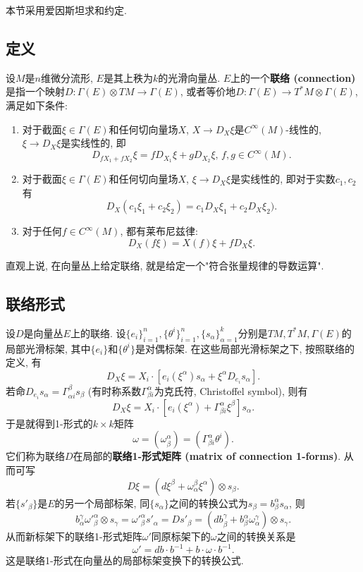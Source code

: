 
本节采用爱因斯坦求和约定.

\subsection{定义}
设$M$是$n$维微分流形, $E$是其上秩为$k$的光滑向量丛. $E$上的一个\textbf{联络 (connection) }是指一个映射$D:\Gamma(E)\otimes TM\to\Gamma(E)$, 或者等价地$D:\Gamma(E)\to T^*M\otimes\Gamma(E)$, 满足如下条件:

\begin{enumerate}
\item 对于截面$\xi\in\Gamma(E)$和任何切向量场$X$, $X\to D_X\xi$是$C^\infty(M)$-线性的, $\xi\to D_X\xi$是实线性的, 即
$$
D_{fX_1+fX_2}\xi=fD_{X_1}\xi+gD_{X_2}\xi,\,f,g\in C^\infty(M).
$$
\item 对于截面$\xi\in\Gamma(E)$和任何切向量场$X$, $\xi\to D_X\xi$是实线性的, 即对于实数$c_1,c_2$有
$$
D_X(c_1\xi_1+c_2\xi_2)=c_1D_X\xi_1+c_2D_X\xi_2).
$$
\item 对于任何$f\in C^\infty(M)$, 都有莱布尼兹律:
$$
D_X(f\xi)=X(f)\xi+fD_X\xi.
$$
\end{enumerate}

直观上说, 在向量丛上给定联络, 就是给定一个"符合张量规律的导数运算". 

\subsection{联络形式}
设$D$是向量丛$E$上的联络. 设$\{e_i\}_{i=1}^n,\{\theta^i\}_{i=1}^n,\{s_\alpha\}_{\alpha=1}^k$分别是$TM,T^*M,\Gamma(E)$的局部光滑标架, 其中$\{e_i\}$和$\{\theta^i\}$是对偶标架. 在这些局部光滑标架之下, 按照联络的定义, 有
$$
D_X\xi=X_i\cdot\left[e_i(\xi^\alpha)s_\alpha+\xi^\alpha D_{e_i}s_\alpha\right].
$$
若命$D_{e_i}s_\alpha=\Gamma_{\alpha i}^\beta s_\beta$ (有时称系数$\Gamma^\alpha_{\beta i}$为克氏符, Christoffel symbol), 则有
$$
D_X\xi=X_i\cdot\left[e_i(\xi^\alpha)+\Gamma_{\beta i}^\alpha\xi^\beta \right]s_\alpha.
$$
于是就得到1-形式的$k\times k$矩阵
$$
\omega=(\omega_\beta^\alpha)=(\Gamma_{\beta i}^\alpha\theta^i).
$$
它们称为联络$D$在局部的\textbf{联络1-形式矩阵 (matrix of connection 1-forms)}. 从而可写
$$
D\xi=(d\xi^\beta+\omega_\alpha^\beta\xi^\alpha)\otimes s_\beta.
$$
若$\{s'_\beta\}$是$E$的另一个局部标架, 同$\{s_\alpha\}$之间的转换公式为$s_\beta=b_\beta^\alpha s_\alpha$, 则
$$
b_\alpha^\gamma{\omega'}_{\beta}^{\alpha}\otimes s_\gamma={\omega'}_{\beta}^{\alpha}s'_\alpha=Ds'_\beta=(db_\beta^\gamma+b_\beta^\alpha\omega_\alpha^\gamma)\otimes s_\gamma.
$$
从而新标架下的联络1-形式矩阵$\omega'$同原标架下的$\omega$之间的转换关系是
$$
\omega'=db\cdot b^{-1}+b\cdot\omega\cdot b^{-1}.
$$
这是联络1-形式在向量丛的局部标架变换下的转换公式.

